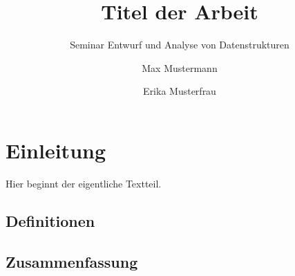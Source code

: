 \documentclass[seminar,english]{info1thesis}
\title{Titel der Arbeit}
\subtitle{Seminar \glqq Entwurf und Analyse von Datenstrukturen\grqq}
\author{Max Mustermann \and Erika Musterfrau}
\begin{document}






\section{Einleitung}
\label{sec:einleitung}

Hier beginnt der eigentliche Textteil.




\subsection{Definitionen}
\label{sec:definitionen}





\subsection{Zusammenfassung}
\label{sec:zusammenfassung}





\thesisbibliography

\end{document}
